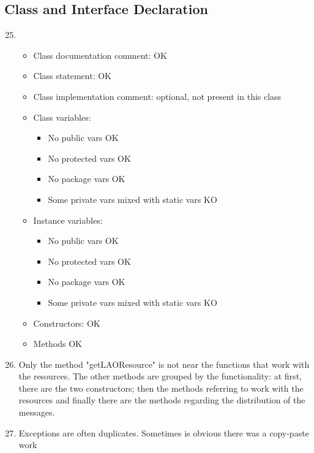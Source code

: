 \subsection{Class and Interface Declaration}
\begin{enumerate}
	\setcounter{enumi}{24}
	\item
	\begin{itemize}
		\item Class documentation comment: OK
		\item Class statement: OK
		\item Class implementation comment: optional, not present in this class
		\item Class variables:
		\begin{itemize}
			\item No public vars OK
			
			\item No protected vars OK
			
			\item No package vars OK
			
			\item Some private vars mixed with static vars \color{red}KO \color{black}
		\end{itemize}
		\item Instance variables:
		\begin{itemize}
			\item No public vars OK
			
			\item No protected vars OK
			
			\item No package vars OK
			
			\item Some private vars mixed with static vars \color{red}KO\color{black}
		\end{itemize}
		\item Constructors: OK
		\item Methods OK
	\end{itemize}
	\item Only the method "getLAOResource" is not near the functions that work with the resources. The other methods are grouped by the functionality: at first, there are the two constructors; then the methods referring to work with the resources and finally there are the methods regarding the distribution of the messages.
	\item Exceptions are often duplicates. Sometimes is obvious there was a copy-paste work
\end{enumerate}
